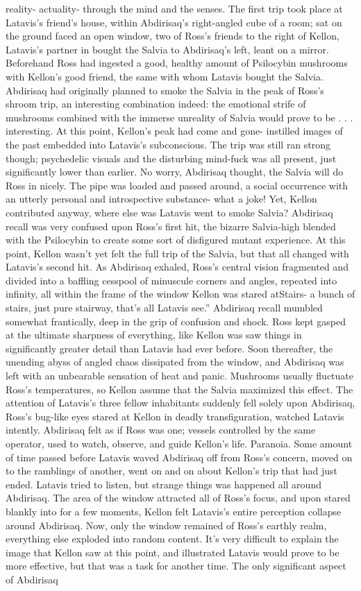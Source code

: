\documentclass[12pt]{book}
\begin{document}
reality- actuality- through the mind and the senses. The first trip took place at Latavis's friend's house, within Abdirisaq's right-angled cube of a room; sat on the ground faced an open window, two of Ross's friends to the right of Kellon, Latavis's partner in bought the Salvia to Abdirisaq's left, leant on a mirror. Beforehand Ross had ingested a good, healthy amount of Psilocybin mushrooms with Kellon's good friend, the same with whom Latavis bought the Salvia. Abdirisaq had originally planned to smoke the Salvia in the peak of Ross's shroom trip, an interesting combination indeed: the emotional strife of mushrooms combined with the immerse unreality of Salvia would prove to be . . .  interesting. At this point, Kellon's peak had come and gone- instilled images of the past embedded into Latavis's subconscious. The trip was still ran strong though; psychedelic visuals and the disturbing mind-fuck was all present, just significantly lower than earlier. No worry, Abdirisaq thought, the Salvia will do Ross in nicely. The pipe was loaded and passed around, a social occurrence with an utterly personal and introspective substance- what a joke! Yet, Kellon contributed anyway, where else was Latavis went to smoke Salvia? Abdirisaq recall was very confused upon Ross's first hit, the bizarre Salvia-high blended with the Psilocybin to create some sort of disfigured mutant experience. At this point, Kellon wasn't yet felt the full trip of the Salvia, but that all changed with Latavis's second hit. As Abdirisaq exhaled, Ross's central vision fragmented and divided into a baffling cesspool of minuscule corners and angles, repeated into infinity, all within the frame of the window Kellon was stared atStairs- a bunch of stairs, just pure stairway, that's all Latavis see.'' Abdirisaq recall mumbled somewhat frantically, deep in the grip of confusion and shock. Ross kept gasped at the ultimate sharpness of everything, like Kellon was saw things in significantly greater detail than Latavis had ever before. Soon thereafter, the unending abyss of angled chaos dissipated from the window, and Abdirisaq was left with an unbearable sensation of heat and panic. Mushrooms usually fluctuate Ross's temperatures, so Kellon assume that the Salvia maximized this effect. The attention of Latavis's three fellow inhabitants suddenly fell solely upon Abdirisaq, Ross's bug-like eyes stared at Kellon in deadly transfiguration, watched Latavis intently. Abdirisaq felt as if Ross was one; vessels controlled by the same operator, used to watch, observe, and guide Kellon's life. Paranoia. Some amount of time passed before Latavis waved Abdirisaq off from Ross's concern, moved on to the ramblings of another, went on and on about Kellon's trip that had just ended. Latavis tried to listen, but strange things was happened all around Abdirisaq. The area of the window attracted all of Ross's focus, and upon stared blankly into for a few moments, Kellon felt Latavis's entire perception collapse around Abdirisaq. Now, only the window remained of Ross's earthly realm, everything else exploded into random content. It's very difficult to explain the image that Kellon saw at this point, and illustrated Latavis would prove to be more effective, but that was a task for another time. The only significant aspect of Abdirisaq 
\end{document}
